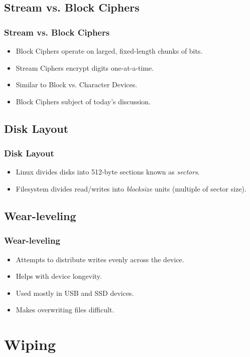 \documentclass[xcolor={dvipsnames,svgnames},hyperref=dvips]{beamer}
\begin{document}
	\subsection{Stream vs. Block Ciphers}
	\begin{frame}
		\frametitle{Stream vs. Block Ciphers}
		\begin{itemize}
		\item Block Ciphers operate on larged, fixed-length chunks of bits.
		\item Stream Ciphers encrypt digits one-at-a-time.
		\item Similar to Block vs. Character Devices.
		\item Block Ciphers subject of today's discussion.
		\end{itemize}
	\end{frame}

	\subsection{Disk Layout}
	\begin{frame}
		\frametitle{Disk Layout}
		\begin{itemize}
		\item Linux divides disks into 512-byte sections known as \textit{sectors}.
		\item Filesystem divides read/writes into \textit{blocksize} units (multiple of sector size).
		\end{itemize}
	\end{frame}

	\subsection{Wear-leveling}
	\begin{frame}
		\frametitle{Wear-leveling}
		\begin{itemize}
		\item Attempts to distribute writes evenly across the device.
		\item Helps with device longevity.
		\item Used mostly in USB and SSD devices.
		\item Makes overwriting files difficult.
		\end{itemize}
	\end{frame}

\section{Wiping}\label{wiping}
\end{document}

